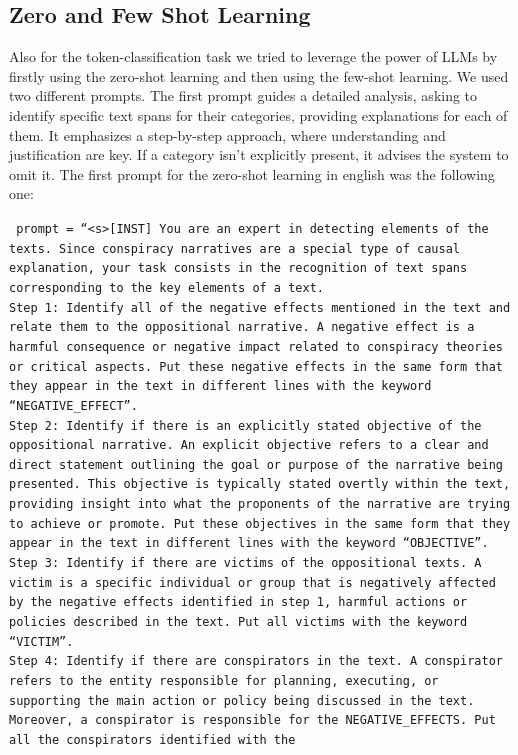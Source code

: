 \documentclass{Configuration_Files/PoliMi3i_thesis}
\begin{document}
\subsection{Zero and Few Shot Learning} \label{subsec:ZSL_FSL_LLMs_T2}
Also for the token-classification task we tried to leverage the power of LLMs by firstly using the zero-shot learning and then using the few-shot learning. We used two different prompts. The first prompt guides a detailed analysis, asking to identify specific text spans for their categories, providing explanations for each of them. It emphasizes a step-by-step approach, where understanding and justification are key. If a category isn’t explicitly present, it advises the system to omit it. The first prompt for the zero-shot learning in english was the following one:
\begin{flushleft}
\footnotesize
\texttt{
prompt = \textquotedblleft <s>[INST] You are an expert in detecting elements of the texts. Since conspiracy narratives are a special type of causal explanation, your task consists in the recognition of text spans corresponding to the key elements of a text.\\
Step 1: Identify all of the negative effects mentioned in the text and relate them to the oppositional narrative. A negative effect is a harmful consequence or negative impact related to conspiracy theories or critical aspects. Put these negative effects in the same form that they appear in the text in different lines with the keyword “NEGATIVE\_EFFECT”.\\
Step 2: Identify if there is an explicitly stated objective of the oppositional narrative. An explicit objective refers to a clear and direct statement outlining the goal or purpose of the narrative being presented. This objective is typically stated overtly within the text, providing insight into what the proponents of the narrative are trying to achieve or promote. Put these objectives in the same form that they appear in the text in different lines with the keyword “OBJECTIVE”.\\
Step 3: Identify if there are victims of the oppositional texts. A victim is a specific individual or group that is negatively affected by the negative effects identified in step 1, harmful actions or policies described in the text. Put all victims with the keyword “VICTIM”.\\
Step 4: Identify if there are conspirators in the text. A conspirator refers to the entity responsible for planning, executing, or supporting the main action or policy being discussed in the text. Moreover, a conspirator is responsible for the NEGATIVE\_EFFECTS. Put all the conspirators identified with the
}
\end{flushleft}
\end{document}
